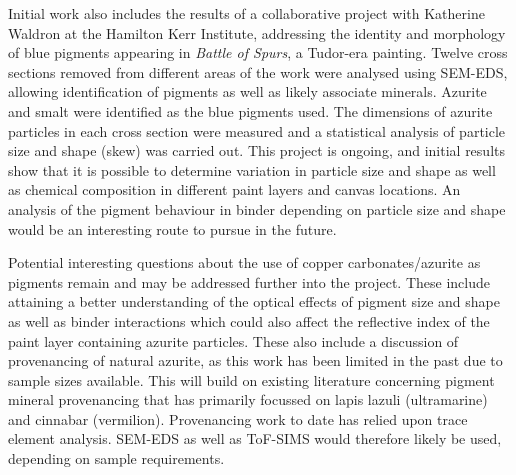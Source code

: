 Initial work also includes the results of a collaborative project with Katherine Waldron at the Hamilton Kerr Institute, addressing the identity and morphology of blue pigments appearing in \textit{Battle of Spurs}, a Tudor-era painting. Twelve cross sections removed from different areas of the work were analysed using SEM-EDS, allowing identification of pigments as well as likely associate minerals. Azurite and smalt were identified as the blue pigments used. The dimensions of azurite particles in each cross section were measured and a statistical analysis of particle size and shape (skew) was carried out. This project is ongoing, and initial results show that it is possible to determine variation in particle size and shape as well as chemical composition in different paint layers and canvas locations. An analysis of the pigment behaviour in binder depending on particle size and shape would be an interesting route to pursue in the future. 

Potential interesting questions about the use of copper carbonates/azurite as pigments remain and may be addressed further into the project. These include attaining a better understanding of the optical effects of pigment size and shape as well as binder interactions which could also affect the reflective index of the paint layer containing azurite particles. These also include a discussion of provenancing of natural azurite, as this work has been limited in the past due to sample sizes available. This will build on existing literature concerning pigment mineral provenancing that has primarily focussed on lapis lazuli (ultramarine) and cinnabar (vermilion). Provenancing work to date has relied upon trace element analysis. SEM-EDS as well as ToF-SIMS would therefore likely be used, depending on sample requirements. 




